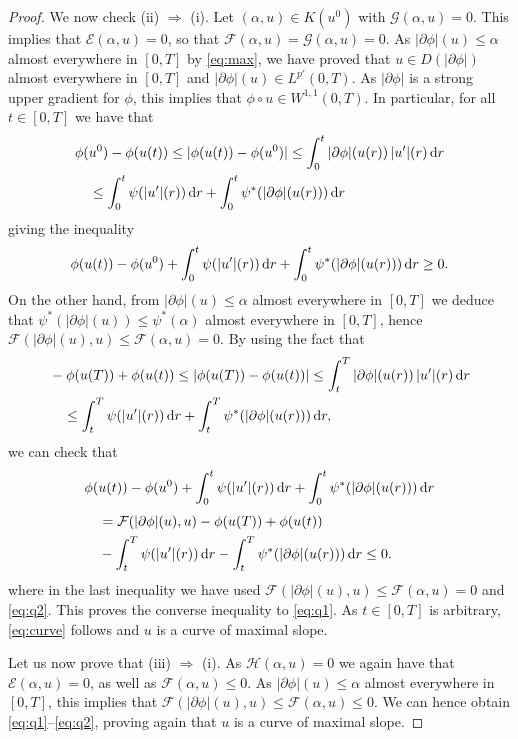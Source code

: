 \documentclass[reqno]{amsart}
\newcommand{\dr}{{\rm d} r}
\renewcommand{\sl}{|\partial \phi|}
\newcommand{\GG}{{\mathcal G}}
\newcommand{\EE}{{\mathcal E}}
\newcommand{\FF}{{\mathcal F}}
\newcommand{\HH}{{\mathcal H}}
\begin{document}
\begin{proof}
 We now check (ii) $\Rightarrow$ (i). Let    $(\alpha,u)\in K(u^0)$ with  
  $\GG(\alpha,u)=0$. This implies
  that  $\EE(\alpha,u) = 0$, so that $\FF(\alpha,u) =   \GG(\alpha,u)=0$. As $\sl(u) \leq \alpha$ almost everywhere in $[0,T]$  by \eqref{eq:max}, we have proved that $u \in
  D(\sl)$ almost everywhere in $[0,T]$ and  
  $\sl(u)\in L^{p'}(0,T)$. As $\sl$ is a strong upper gradient for
  $\phi$, this implies that $\phi\circ u\in W^{1,1}(0,T)$. In
  particular, for all $t\in [0,T]$ we have that
  \begin{align*}
    &\phi(u^0)-\phi(u(t))\leq |\phi(u(t))-\phi(u^0)| \leq \int_0^t \sl(u(r))\, |u'|(r)\, \dr \\
    &\quad\leq
    \int_0^t\psi( |u'| (r))\, \dr +  \int_0^t\psi^*(\sl  (u(r)))\,
    \dr 
  \end{align*}
 giving the inequality
  \begin{equation} \phi(u(t)) - \phi(u^0) + 
     \int_0^t\psi( |u'| (r))\, \dr +  \int_0^t\psi^*(\sl (u(r)))\,
    \dr \geq 0.\label{eq:q1}
    \end{equation}
 On the other hand, from $\sl(u) \leq \alpha$ almost everywhere in
 $[0,T]$ we deduce that $\psi^*(\sl(u))\leq \psi^*(\alpha)$ almost everywhere in
 $[0,T]$, hence $\FF(\sl(u),u)\leq \FF(\alpha,u)=0$.  By using the fact that 
    \begin{align}
      &-\phi(u(T)) +\phi(u(t)) \leq |\phi(u(T))-\phi(u(t))|\leq
      \int_t^T \sl(u(r))\, |u'|(r)\, \dr \nonumber \\
      &\quad \leq
   \int_t^T\psi( |u'| (r))\, \dr +  \int_t^T\psi^*(\sl  (u(r)))\,
    \dr, \label{eq:q2}
    \end{align}
    we can check that 
  \begin{align*}
    &\phi(u(t))-\phi(u^0) + \int_0^t\psi( |u'| (r))\, \dr +
      \int_0^t\psi^*(\sl  (u(r)))\,
    \dr  \\[1mm]
    &\quad = \FF(\sl (u),u) -\phi(u(T))+\phi(u(t)) \\
    &\quad - \int_t^T\psi( |u'| (r))\, \dr -
      \int_t^T\psi^*(\sl (u(r)))\,
    \dr   \leq 0.
  \end{align*}
  where in the last inequality we have used $\FF(\sl (u),u)\leq \FF(\alpha,u)=0$ and
  \eqref{eq:q2}. This proves the converse inequality to
  \eqref{eq:q1}. As $t \in [0,T]$ is arbitrary,   \eqref{eq:curve}
  follows and $u$ is a curve of maximal slope.

   Let us now prove that (iii) $\Rightarrow$ (i). As
  $\HH(\alpha,u)=0$ we again have that $  \EE(\alpha,u)=0$, as well as
  $\FF(\alpha,u) \leq 0$. As $  \sl(u)\leq \alpha$ almost everywhere in $[0,T]$, this implies that  
  $\FF(\sl(u),u)\leq \FF(\alpha,u) \leq 0$. We can hence  obtain 
  \eqref{eq:q1}--\eqref{eq:q2}, proving again that $u$ is a curve of
  maximal slope. 
\end{proof}
\end{document}
